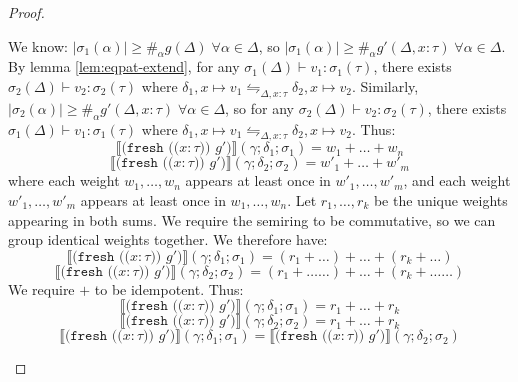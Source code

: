 \documentclass{report}
\theoremstyle{definition}
\newcommand{\den}[1]{\llbracket #1 \rrbracket}
\newcommand{\eqpat}{\leftrightharpoons}
\begin{document}
\begin{proof}
\begin{itemize}
			We know: \(|\sigma_1(\alpha)| \ge \#_\alpha g(\Delta) \; \forall \alpha \in \Delta\),
			so \(|\sigma_1(\alpha)| \ge \#_\alpha g'(\Delta,x:\tau) \; \forall \alpha \in \Delta\).
			By lemma \ref{lem:eqpat-extend}, for any \(\sigma_1(\Delta) \vdash v_1 : \sigma_1(\tau)\),
			there exists \(\sigma_2(\Delta) \vdash v_2 : \sigma_2(\tau)\) where \(\delta_1, x \mapsto v_1 \eqpat_{\Delta, x:\tau} \delta_2, x \mapsto v_2\).
			Similarly, \(|\sigma_2(\alpha)| \ge \#_\alpha g'(\Delta,x:\tau) \; \forall \alpha \in \Delta\), so for any \(\sigma_2(\Delta) \vdash v_2 : \sigma_2(\tau)\),
			there exists \(\sigma_1(\Delta) \vdash v_1 : \sigma_1(\tau)\) where \(\delta_1, x \mapsto v_1 \eqpat_{\Delta, x:\tau} \delta_2, x \mapsto v_2\).
			Thus:
			\begin{equation}
				\den{\texttt{(fresh ((\(x : \tau\))) \(g'\))}}(\gamma; \delta_1; \sigma_1) = w_1 + \dots + w_n
			\end{equation}
			\begin{equation}
				\den{\texttt{(fresh ((\(x : \tau\))) \(g'\))}}(\gamma; \delta_2; \sigma_2) = w'_1 + \dots + w'_m
			\end{equation}
			where each weight \(w_1, \dots, w_n\) appears at least once in \(w'_1, \dots, w'_m\),
			and each weight \(w'_1, \dots, w'_m\) appears at least once in \(w_1, \dots, w_n\).
			Let \(r_1, \dots, r_k\) be the unique weights appearing in both sums.
			We require the semiring to be commutative, so we can group identical weights together.
			We therefore have:
			\begin{equation}
				\den{\texttt{(fresh ((\(x : \tau\))) \(g'\))}}(\gamma; \delta_1; \sigma_1) = (r_1 + \dots) + \dots + (r_k + \dots)
			\end{equation}
			\begin{equation}
				\den{\texttt{(fresh ((\(x : \tau\))) \(g'\))}}(\gamma; \delta_2; \sigma_2) = (r_1 + \dots\dots) + \dots + (r_k + \dots\dots)
			\end{equation}
			We require \(+\) to be idempotent.
			Thus:
			\begin{equation}
				\den{\texttt{(fresh ((\(x : \tau\))) \(g'\))}}(\gamma; \delta_1; \sigma_1) = r_1 + \dots + r_k
			\end{equation}
			\begin{equation}
				\den{\texttt{(fresh ((\(x : \tau\))) \(g'\))}}(\gamma; \delta_2; \sigma_2) = r_1 + \dots + r_k
			\end{equation}
			\begin{equation}
				\den{\texttt{(fresh ((\(x : \tau\))) \(g'\))}}(\gamma; \delta_1; \sigma_1) = \den{\texttt{(fresh ((\(x : \tau\))) \(g'\))}}(\gamma; \delta_2; \sigma_2)

\end{equation}
\end{itemize}
\end{proof}
\end{document}
